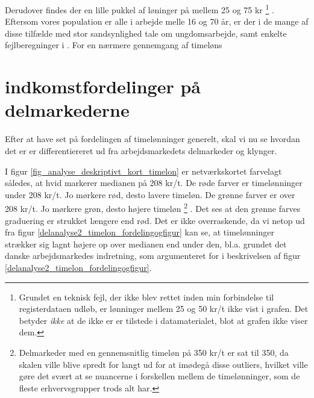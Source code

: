 Derudover findes der en lille pukkel af løninger på mellem 25 og 75 kr%
%
\footnote{ Grundet en teknisk fejl, der ikke blev rettet inden min forbindelse til registerdataen udløb, er lønninger mellem 25 og 50 kr/t ikke vist i grafen. Det betyder \emph{ikke} at de ikke er er tilstede i datamaterialet, blot at grafen ikke viser dem.}%
%
. Eftersom vores population er alle i arbejde melle 16 og 70 år, er der i de mange af disse tilfælde med stor sandsynlighed tale om ungdomsarbejde, samt enkelte fejlberegninger i . For en nærmere gennemgang af timeløns 

            \section{
%
            indkomstfordelinger på delmarkederne 
%            
            \label{sec delanalyse2 loen paa delmarkederne}}

Efter at have set på fordelingen af timelønninger generelt, skal vi nu se hvordan det er er differentiereret ud fra arbejdsmarkedets delmarkeder og klynger.  

I figur \ref{fig_analyse_deskriptivt_kort_timelon} er netværkskortet farvelagt således, at hvid markerer medianen på 208 kr/t. De røde farver er timelønninger under 208 kr/t. Jo mørkere rød, desto lavere timeløn. De grønne farver er over 208 kr/t. Jo mørkere grøn, desto højere timeløn%
%
\footnote{ Delmarkeder med en gennemsnitlig timeløn på 350 kr/t er sat til 350, da skalen ville blive spredt for langt ud for at imødegå disse outliers, hvilket ville gøre det svært at se nuancerne i forskellen mellem de timelønninger, som de fleste erhvervsgrupper trods alt har.}%
%
. Det ses at den grønne farves graduering er strukket længere end rød. Det er ikke overraskende, da vi netop ud fra figur \ref{delanalyse2_timelon_fordelingogfigur} kan se, at timelønninger strækker sig lagnt højere op over medianen end under den, bl.a. grundet det danske arbejdsmarkedes indretning, som argumenteret for i beskrivelsen af figur \ref{delanalyse2_timelon_fordelingogfigur}.

